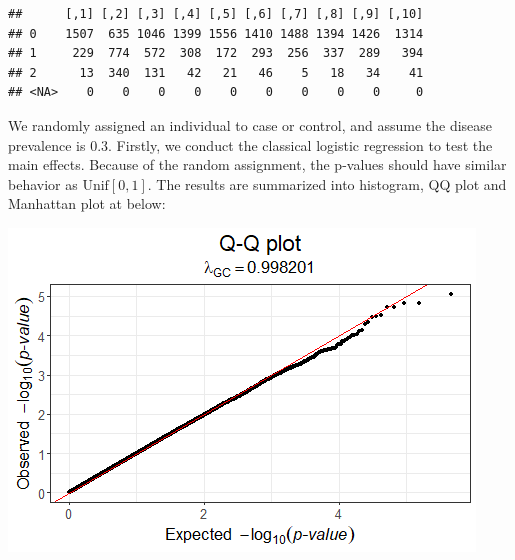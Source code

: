 \documentclass[
]{article}
\newenvironment{Shaded}{\begin{snugshade}}{\end{snugshade}}
\newcommand{\CommentTok}[1]{\textcolor[rgb]{0.56,0.35,0.01}{\textit{#1}}}
\newcommand{\DataTypeTok}[1]{\textcolor[rgb]{0.13,0.29,0.53}{#1}}
\newcommand{\DecValTok}[1]{\textcolor[rgb]{0.00,0.00,0.81}{#1}}
\newcommand{\FloatTok}[1]{\textcolor[rgb]{0.00,0.00,0.81}{#1}}
\newcommand{\KeywordTok}[1]{\textcolor[rgb]{0.13,0.29,0.53}{\textbf{#1}}}
\newcommand{\NormalTok}[1]{#1}
\newcommand{\OperatorTok}[1]{\textcolor[rgb]{0.81,0.36,0.00}{\textbf{#1}}}
\newcommand{\StringTok}[1]{\textcolor[rgb]{0.31,0.60,0.02}{#1}}
\begin{document}
\begin{verbatim}
##      [,1] [,2] [,3] [,4] [,5] [,6] [,7] [,8] [,9] [,10]
## 0    1507  635 1046 1399 1556 1410 1488 1394 1426  1314
## 1     229  774  572  308  172  293  256  337  289   394
## 2      13  340  131   42   21   46    5   18   34    41
## <NA>    0    0    0    0    0    0    0    0    0     0
\end{verbatim}

We randomly assigned an individual to case or control, and assume the
disease prevalence is 0.3. Firstly, we conduct the classical logistic
regression to test the main effects. Because of the random assignment,
the p-values should have similar behavior as \(\text{Unif}[0,1]\). The
results are summarized into histogram, QQ plot and Manhattan plot at
below:

\begin{Shaded}
\end{Shaded}

\includegraphics{stats-gene-research-progress-v8_files/figure-latex/unnamed-chunk-2-1.png}
\end{document}
